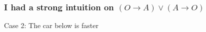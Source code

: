 \documentclass[slidestop,compress,mathserif]{beamer}
\begin{document}
 \begin{frame}
  {
  \frametitle{I had a strong intuition on $(O\rightarrow
  A)\lor (A\rightarrow O)$}
  }

  { Case 2: The car below is faster}

\end{frame}
\end{document}
